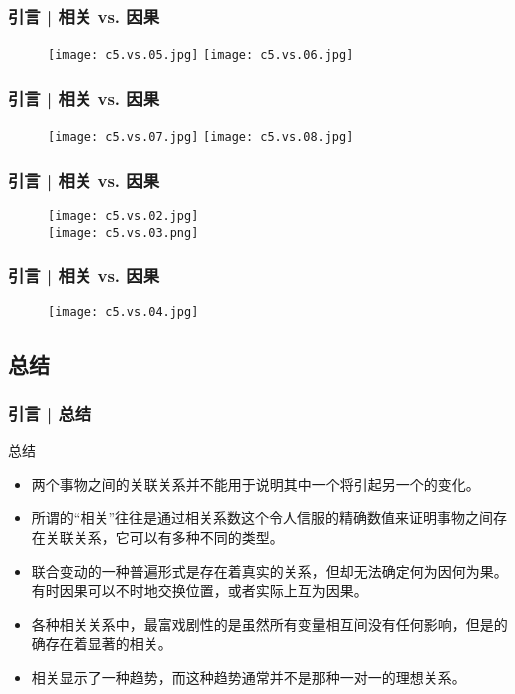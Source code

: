 \begin{frame}
  \frametitle{引言 | 相关 vs. 因果}
  \begin{figure}
    \centering
    \texttt{[image: c5.vs.05.jpg]}
    \texttt{[image: c5.vs.06.jpg]}
  \end{figure}
\end{frame}

\begin{frame}
  \frametitle{引言 | 相关 vs. 因果}
  \begin{figure}
    \centering
    \texttt{[image: c5.vs.07.jpg]}
    \texttt{[image: c5.vs.08.jpg]}
  \end{figure}
\end{frame}

\begin{frame}
  \frametitle{引言 | 相关 vs. 因果}
  \begin{figure}
    \centering
    \texttt{[image: c5.vs.02.jpg]}\\
    \texttt{[image: c5.vs.03.png]}
  \end{figure}
\end{frame}

\begin{frame}
  \frametitle{引言 | 相关 vs. 因果}
  \begin{figure}
    \centering
    \texttt{[image: c5.vs.04.jpg]}
  \end{figure}
\end{frame}

\subsection{总结}
\begin{frame}
  \frametitle{引言 | 总结}
  \begin{block}{总结}
    \begin{itemize}
      \item \alert{两个事物之间的关联关系并不能用于说明其中一个将引起另一个的变化。}
      \item 所谓的“相关”往往是通过相关系数这个令人信服的精确数值来证明事物之间存在关联关系，它可以有多种不同的类型。
      \item 联合变动的一种普遍形式是存在着真实的关系，但却无法确定何为因何为果。有时因果可以不时地交换位置，或者实际上互为因果。
      \item 各种相关关系中，最富戏剧性的是虽然所有变量相互间没有任何影响，但是的确存在着显著的相关。
      \item 相关显示了一种趋势，而这种趋势通常并不是那种一对一的理想关系。
    \end{itemize}
  \end{block}
\end{frame}

